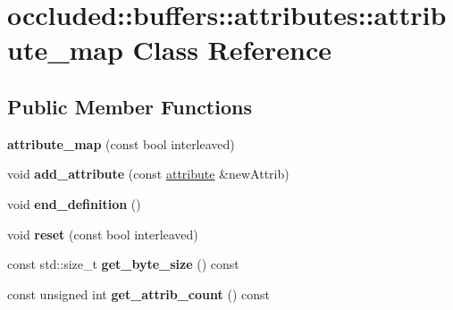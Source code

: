 \hypertarget{classoccluded_1_1buffers_1_1attributes_1_1attribute__map}{\section{occluded\+:\+:buffers\+:\+:attributes\+:\+:attribute\+\_\+map Class Reference}
\label{classoccluded_1_1buffers_1_1attributes_1_1attribute__map}
}
\subsection*{Public Member Functions}
\begin{DoxyCompactItemize}
\item 
\hypertarget{classoccluded_1_1buffers_1_1attributes_1_1attribute__map_a4915c4e6bfd59584dc22fb2685f40d02}{{\bfseries attribute\+\_\+map} (const bool interleaved)}\label{classoccluded_1_1buffers_1_1attributes_1_1attribute__map_a4915c4e6bfd59584dc22fb2685f40d02}

\item 
\hypertarget{classoccluded_1_1buffers_1_1attributes_1_1attribute__map_a23c2b0154dd3478fc1877a04e479624a}{void {\bfseries add\+\_\+attribute} (const \hyperlink{classoccluded_1_1buffers_1_1attributes_1_1attribute}{attribute} \&new\+Attrib)}\label{classoccluded_1_1buffers_1_1attributes_1_1attribute__map_a23c2b0154dd3478fc1877a04e479624a}

\item 
\hypertarget{classoccluded_1_1buffers_1_1attributes_1_1attribute__map_a6c64d6c47c0942c714d0105163e250aa}{void {\bfseries end\+\_\+definition} ()}\label{classoccluded_1_1buffers_1_1attributes_1_1attribute__map_a6c64d6c47c0942c714d0105163e250aa}

\item 
\hypertarget{classoccluded_1_1buffers_1_1attributes_1_1attribute__map_a4b55a620f00eaf746ef55063b8e9f6ff}{void {\bfseries reset} (const bool interleaved)}\label{classoccluded_1_1buffers_1_1attributes_1_1attribute__map_a4b55a620f00eaf746ef55063b8e9f6ff}

\item 
\hypertarget{classoccluded_1_1buffers_1_1attributes_1_1attribute__map_ad886ab232a2f74be15e3930145545caf}{const std\+::size\+\_\+t {\bfseries get\+\_\+byte\+\_\+size} () const }\label{classoccluded_1_1buffers_1_1attributes_1_1attribute__map_ad886ab232a2f74be15e3930145545caf}

\item 
\hypertarget{classoccluded_1_1buffers_1_1attributes_1_1attribute__map_ae78420eeed982caaaa77cada069c315f}{const unsigned int {\bfseries get\+\_\+attrib\+\_\+count} () const }\label{classoccluded_1_1buffers_1_1attributes_1_1attribute__map_ae78420eeed982caaaa77cada069c315f}


\end{DoxyCompactItemize}
